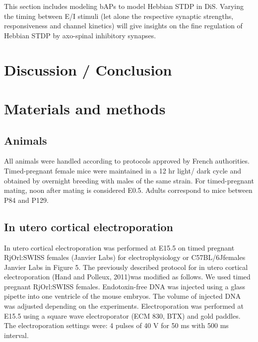 \documentclass[10pt,letterpaper]{article}
\begin{document}
This section includes modeling bAPs to model Hebbian STDP in DiS. Varying the timing between E/I stimuli (let alone the respective synaptic strengths, responsiveness and channel kinetics) will give insights on the fine regulation of Hebbian STDP by axo-spinal inhibitory synapses.

\section*{Discussion / Conclusion}


%
%
% 


\section*{Materials and methods}
\subsection*{Animals}
All animals were handled according to protocols approved by French authorities. Timed-pregnant female mice were maintained in a 12 hr light/ dark cycle and obtained by overnight breeding with males of the same strain. For timed-pregnant mating, noon after mating is considered E0.5. Adults correspond to mice between P84 and P129.

\subsection*{In utero cortical electroporation}
In   utero cortical   electroporation   was   performed at   E15.5 on   timed   pregnant RjOrl:SWISS females (Janvier Labs) for electrophysiology or C57BL/6Jfemales Janvier Labs in Figure 5. 
The previously described protocol for in utero cortical  electroporation (Hand  and  Polleux,  2011)was  modified  as  follows.  We  used  timed  pregnant  RjOrl:SWISS females. Endotoxin-free  DNA  was injected  using  a  glass  pipette  into  one  ventricle  of  the  mouse  embryos.  The  volume  of  injected  DNA  was  adjusted depending  on  the  experiments.  Electroporation  was  performed  at  E15.5  using  a  square  wave  electroporator  (ECM 830,  BTX)  and  gold  paddles.  The  electroporation  settings  were:  4  pulses  of  40  V  for  50  ms  with  500  ms  interval. 
\end{document}
